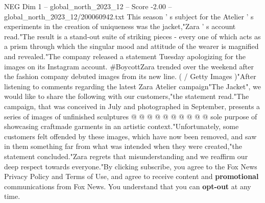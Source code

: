 \begin{textsample}{NEG Dim 1 – global\_north\_2023\_12 – Score -2.00 – global\_north\_2023\_12/200060942.txt}
This season ' s subject for the Atelier ' s experiments in the creation of uniqueness was the jacket,"Zara ' s account read."The result is a stand-out suite of striking pieces - every one of which acts as a prism through which the singular mood and attitude of the wearer is magnified and revealed."The company released a statement Tuesday apologizing for the images on its Instagram account. \#BoycottZara trended over the weekend after the fashion company debuted images from its new line. ( / Getty Images )"After listening to comments regarding the latest Zara Atelier campaign"The Jacket", we would like to share the following with our customers,"the statement read."The campaign, that was conceived in July and photographed in September, presents a series of images of unfinished sculptures @ @ @ @ @ @ @ @ @ @ sole purpose of showcasing craftmade garments in an artistic context."Unfortunately, some customers felt offended by these images, which have now been removed, and saw in them something far from what was intended when they were created,"the statement concluded."Zara regrets that misunderstanding and we reaffirm our deep respect towards everyone."By clicking subscribe, you agree to the Fox News Privacy Policy and Terms of Use, and agree to receive content and \textbf{promotional} communications from Fox News.
You understand that you can \textbf{opt-out} at any time.

\end{textsample}
